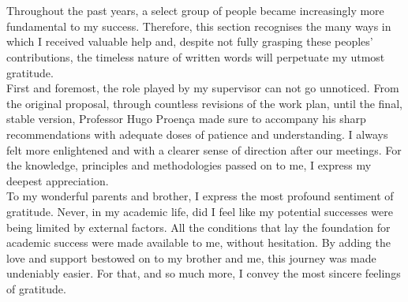 \documentclass[11pt,twoside]{template/estiloUBI}
\begin{document}
\onehalfspacing





\pagestyle{fancy}
\cfoot{\thepage}

\cleardoublepage



\newpage 	
\section*{}
\vspace{0.5cm}


Throughout the past years, a select group of people became increasingly more fundamental to my success. Therefore, this section recognises the many ways in which I received valuable help and, despite not fully grasping these peoples' contributions, the timeless nature of written words will perpetuate my utmost gratitude.\\

First and foremost, the role played by my supervisor can not go unnoticed. From the original proposal, through countless revisions of the work plan, until the final, stable version, Professor Hugo Proen\c{c}a made sure to accompany his sharp recommendations with adequate doses of patience and understanding. I always felt more enlightened and with a clearer sense of direction after our meetings. For the knowledge, principles and methodologies passed on to me, I express my deepest appreciation.\\

To my wonderful parents and brother, I express the most profound sentiment of gratitude. Never, in my academic life, did I feel like my potential successes were being limited by external factors. All the conditions that lay the foundation for academic success were made available to me, without hesitation. By adding the love and support bestowed on to my brother and me, this journey was made undeniably easier. For that, and so much more, I convey the most sincere feelings of gratitude.\\
\end{document}
